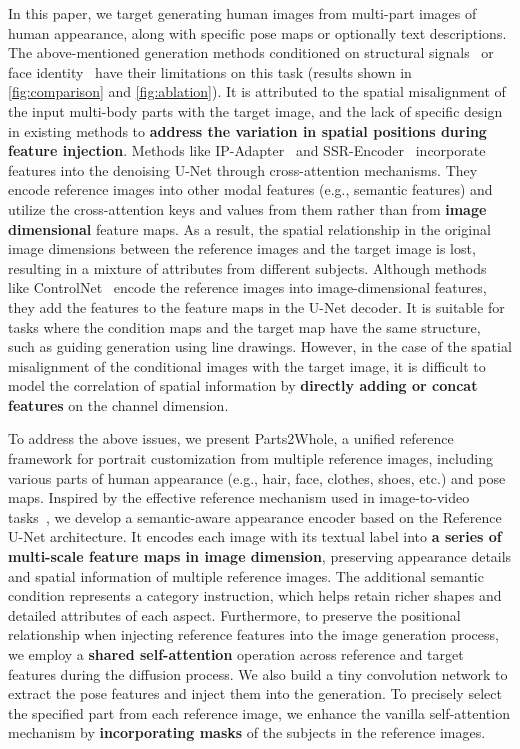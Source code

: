 In this paper, we target generating human images from multi-part images of human appearance, along with specific pose maps or optionally text descriptions. The above-mentioned generation methods conditioned on structural signals~\cite{zhang2023controlnet, mou2023t2iadapter} or face identity~\cite{ruiz2023dreambooth, hu2021lora, gal2022textualinversion, ye2023ipadapter, wang2024instantid, zhang2024ssrencoder} have their limitations on this task (results shown in \cref{fig:comparison} and \cref{fig:ablation}). It is attributed to the spatial misalignment of the input multi-body parts with the target image, and the lack of specific design in existing methods to \textbf{address the variation in spatial positions during feature injection}. Methods like IP-Adapter~\cite{ye2023ipadapter} and SSR-Encoder~\cite{zhang2024ssrencoder} incorporate features into the denoising U-Net through cross-attention mechanisms. They encode reference images into other modal features (e.g., semantic features) and utilize the cross-attention keys and values from them rather than from \textbf{image dimensional} feature maps. As a result, the spatial relationship in the original image dimensions between the reference images and the target image is lost, resulting in a mixture of attributes from different subjects. Although methods like ControlNet~\cite{zhang2023controlnet} encode the reference images into image-dimensional features, they add the features to the feature maps in the U-Net decoder. It is suitable for tasks where the condition maps and the target map have the same structure, such as guiding generation using line drawings. However, in the case of the spatial misalignment of the conditional images with the target image, it is difficult to model the correlation of spatial information by \textbf{directly adding or concat features} on the channel dimension.

To address the above issues, we present Parts2Whole, a unified reference framework for portrait customization from multiple reference images, including various parts of human appearance (e.g., hair, face, clothes, shoes, etc.) and pose maps. Inspired by the effective reference mechanism used in image-to-video tasks~\cite{hu2023animateanyone, xu2023magicanimate}, we develop a semantic-aware appearance encoder based on the Reference U-Net architecture. It encodes each image with its textual label into \textbf{a series of multi-scale feature maps in image dimension}, preserving appearance details and spatial information of multiple reference images. The additional semantic condition represents a category instruction, which helps retain richer shapes and detailed attributes of each aspect. Furthermore, to preserve the positional relationship when injecting reference features into the image generation process, we employ a \textbf{shared self-attention} operation across reference and target features during the diffusion process. We also build a tiny convolution network to extract the pose features and inject them into the generation. To precisely select the specified part from each reference image, we enhance the vanilla self-attention mechanism by \textbf{incorporating masks} of the subjects in the reference images.

